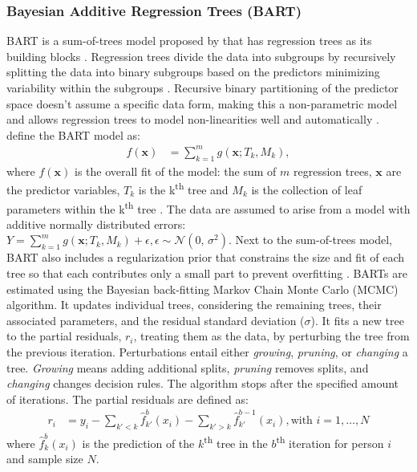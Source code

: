 \documentclass[10pt, a4paper, titlepage]{article}
\begin{document}
\subsubsection{Bayesian Additive Regression Trees (BART)}
BART is a sum-of-trees model proposed by \citet{chipman2010} that has regression trees as its building blocks \citep{chipman2010, hill2020, james2021}. Regression trees divide the data into subgroups by recursively splitting the data into binary subgroups based on the predictors minimizing variability within the subgroups \citep{hastie2017, james2021, salditt2023}. Recursive binary partitioning of the predictor space doesn't assume a specific data form, making this a non-parametric model \citep{hastie2017, james2021, salditt2023} and allows regression trees to model non-linearities well and automatically \citep{hill2020, burgette2010}. \citet{chipman2010} define the BART model as:
\begin{subequations}
\label{eq:BART}
\begin{align}
f(\textbf{x}) &= \sum^{m}_{k=1}g(\textbf{x}; T_{k}, M_{k}), \tag{1}
\end{align}
\end{subequations} where $f(\mathbf{x})$ is the overall fit of the model: the sum of $m$ regression trees, $\textbf{x}$ are the predictor variables, $T_{k}$ is the k\textsuperscript{th} tree and $M_{k}$ is the collection of leaf parameters within the k\textsuperscript{th} tree \citep{chipman2010, hill2020, james2021}. The data are assumed to arise from a model with additive normally distributed errors: $Y = \sum^{m}_{k=1}g(\textbf{x}; T_{k}, M_{k}) + \epsilon, \epsilon \sim \mathcal{N}(0,\,\sigma^{2})$.
Next to the sum-of-trees model, BART also includes a regularization prior that constrains the size and fit of each tree so that each contributes only a small part to prevent overfitting \citep{chipman2010, hill2020, james2021}. BARTs are estimated using the Bayesian back-fitting Markov Chain Monte Carlo (MCMC) algorithm. It updates individual trees, considering the remaining trees, their associated parameters, and the residual standard deviation ($\sigma$). It fits a new tree to the partial residuals, $r_{i}$, treating them as the data, by perturbing the tree from the previous iteration. Perturbations entail either \textit{growing}, \textit{pruning}, or \textit{changing} a tree. \textit{Growing} means adding additional splits, \textit{pruning} removes splits, and \textit{changing} changes decision rules. The algorithm stops after the specified amount of iterations. The partial residuals are defined as:
\begin{subequations}
\label{eq:partialresiduals}
\begin{align}
r_i &= y_i - \sum_{k' < k} \hat{f}^{b}_{k'}(x_{i}) - \sum_{k' > k} \hat{f}^{b-1}_{k'}(x_{i}), \text{with } i = 1, \dots, N \tag{2}
\end{align}
\end{subequations} where $\hat{f}^{b}_{k}(x_{i})$ is the prediction of the $k$\textsuperscript{th} tree in the $b$\textsuperscript{th} iteration for person $i$ and sample size $N$.
\end{document}
